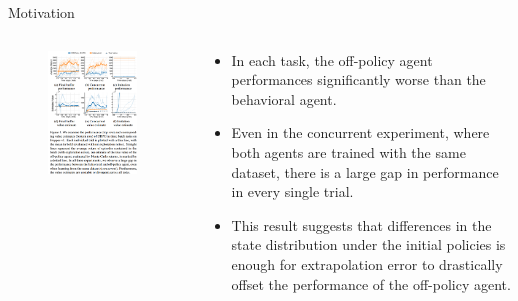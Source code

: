 \documentclass[11pt]{beamer}
\begin{document}
\begin{frame}{Motivation}
    \begin{columns}
        \begin{column}{0.5\textwidth}
            \begin{figure}
                \centering
            \includegraphics[width=0.9\textwidth]{figure1.png}
            \end{figure}
        \end{column}
        \begin{column}{0.5\textwidth}
            \begin{itemize}
                \item In each task, the off-policy agent performances significantly worse than the behavioral agent.
                \item Even in the concurrent experiment, where both agents are trained with the same dataset, there is a large gap in performance in every single trial.
                \item This result suggests that differences in the state distribution under the initial policies is enough for extrapolation error to drastically offset the performance of the off-policy agent.
            \end{itemize}
        \end{column}
    \end{columns}
\end{frame}
\end{document}
